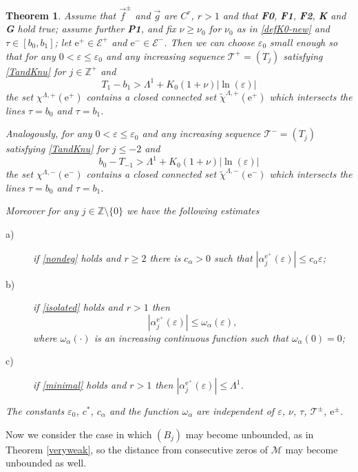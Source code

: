 \documentclass[10pt]{article}
\numberwithin{equation}{section}
\def\al{\alpha}
\def\ep{\varepsilon}
\def\Z{{\mathbb Z}}
\def\ee{{\mathrm e}}
\def\EE{{\mathcal E}}
\def\MM{{\mathcal M}}
\def\TT{{\mathcal T}}
\def\l1{\Lambda^{1}}
\def\f{\vec{f}}
\def\g{\vec{g}}
\newcommand\assump[1]{{\rm\textbf{#1}}}
\newtheorem{theorem}{Theorem}[section]
\theoremstyle{definition}
\theoremstyle{remark}
\begin{document}
\begin{theorem}\label{T.connectionLa}
Assume  that  $\f^{\pm}$ and $\g$ are $C^r$, $r>1$ and that \assump{F0}, \assump{F1}, \assump{F2}, \assump{K} and \assump{G} hold true; assume further
\assump{P1},
and fix $\nu \ge \nu_0$ for $\nu_0$ as in \eqref{defK0-new} and   $\tau \in [b_0, b_1]$; let $\ee^+ \in \EE^+$ and $\ee^- \in \EE^-$.
Then we can choose $\ep_0$ small enough so that for any $0< \ep \le \ep_0$
and any increasing sequence $\mathcal{T}^+=(T_j)$ satisfying
 \eqref{TandKnu} for $j \in \Z^+$ and
\begin{equation}\label{TandKnu_tau+}
	 T_1-b_1 >   \l1 + K_0(1+\nu)   |\ln(\ep)| %
\end{equation}
 the set $ \chi^{\Lambda,+}(\ee^+)$  contains a closed connected set $\tilde{\chi}^{\Lambda,+}(\ee^+)$
which intersects the lines $\tau=b_0$ and $\tau=b_1$.

Analogously,     for any $0< \ep \le \ep_0$
and any increasing sequence $\mathcal{T}^-=(T_j)$  satisfying
 \eqref{TandKnu} for $j \le -2$ and
\begin{equation}\label{TandKnu_tau-}
	 b_0-T_{-1} >   \l1 + K_0(1+\nu)   |\ln(\ep)| %
\end{equation}
 the set $ \chi^{\Lambda,-}(\ee^-)$  contains a closed connected set $\tilde{\chi}^{\Lambda,-}(\ee^-)$
which intersects the lines $\tau=b_0$ and $\tau=b_1$.

  Moreover for any $j \in \mathbb{Z}\setminus \{0\}$ we have the following estimates
    \begin{description}
    \item[a)] if \eqref{nondeg} holds and $r \ge 2$   there is $c_{\alpha}> 0$  such that $|\al_{j}^{\ee^+}(\ep)| \le c_{\alpha}\ep$;
    \item[b)] if \eqref{isolated} holds and $r>1$ then
    $$|\al_{j}^{\ee^+}(\ep)| \le \omega_{\alpha} (\ep) ,$$
    where $\omega_{\alpha}(\cdot)$ is an increasing continuous function such that $\omega_{\alpha}(0)=0$;
    \item[c)] if \eqref{minimal} holds and $r>1$ then $|\al_{j}^{\ee^+}(\ep)| \le \l1$.
  \end{description}
  The constants $\ep_0$, $c^*$, $c_{\alpha}$  and the function  $\omega_{\alpha}$ are  independent of
   $\ep$,
    $\nu$, $\tau$, $\TT^{\pm}$,
  $\ee^{\pm}$.
\end{theorem}


Now we consider the case in  which $(B_j)$ may become unbounded, as in Theorem \ref{veryweak}, so the distance
 from consecutive zeros of $\MM$ may become unbounded as well.
\end{document}
